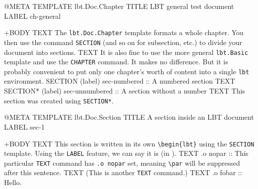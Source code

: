 \documentclass[a4paper,oneside,11pt]{memoir}
\begin{document}
\lbtDraftModeOff{}

\tableofcontents



\begin{lbt}
  @META
    TEMPLATE   lbt.Doc.Chapter
    TITLE      LBT general test document
    LABEL      ch-general

  +BODY
    TEXT The \texttt{lbt.Doc.Chapter} template formats a whole chapter. You then use the command \texttt{SECTION} (and so on for subsection, etc.) to divide your document into sections.
    TEXT It is also fine to use the more general \texttt{lbt.Basic} template and use the \texttt{CHAPTER} command. It makes no difference. But it is probably convenient to put only one chapter's worth of content into a single \texttt{lbt} environment.
    SECTION (label) sec-numbered :: A numbered section
    TEXT \kant[2-3]
    SECTION* (label) sec-unnumbered :: A section without a number
    TEXT This section was created using \texttt{SECTION*}.
\end{lbt}

\begin{lbt}
  @META
    TEMPLATE   lbt.Doc.Section
    TITLE      A section inside an LBT document
    LABEL      sec-1

  +BODY
    TEXT This section is written in its own \verb|\begin{lbt}| using the \texttt{SECTION} template. Using the \texttt{LABEL} feature, we can say it is  (in ).
    TEXT .o nopar :: This particular \texttt{TEXT} command has \texttt{.o nopar} set, meaning \verb|\par| will be suppressed after this sentence.
    TEXT (This is another \texttt{TEXT} command.)
    TEXT .o fobar :: Hello.
\end{lbt}

\end{document}
